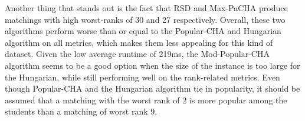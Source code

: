 \begin{table}[h!]
  \centering
  \caption{Average results for large uniform dataset with complete preferences.}
  \label{tab:results-uniform-large-complete}
\end{table}

Another thing that stands out is the fact that RSD and Max-PaCHA produce matchings with high worst-ranks of 30 and 27 respectively. Overall, these two algorithms perform worse than or equal to the Popular-CHA and Hungarian algorithm on all metrics, which makes them less appealing for this kind of dataset. Given the low average runtime of 219ms, the Mod-Popular-CHA algorithm seems to be a good option when the size of the instance is too large for the Hungarian, while still performing well on the rank-related metrics. Even though Popular-CHA and the Hungarian algorithm tie in popularity, it should be assumed that a matching with the worst rank of 2 is more popular among the students than a matching of worst rank 9. 

